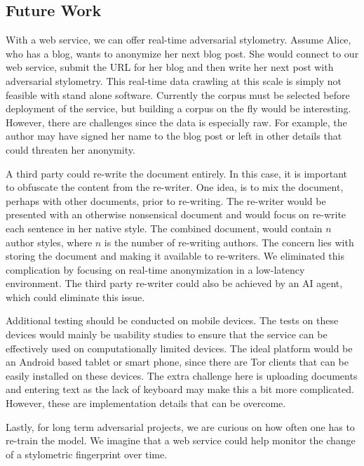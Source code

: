 \documentclass[letterpaper]{article}
\begin{document}
\subsection*{Future Work}

With a web service, we can offer real-time adversarial stylometry.
Assume Alice, who has a blog, wants to anonymize her next blog post.
She would connect to our web service, submit the URL for her blog and
then write her next post with adversarial stylometry.  This real-time
data crawling at this scale is simply not feasible with stand alone
software.  Currently the corpus must be selected before deployment of
the service, but building a corpus on the fly would be interesting.
However, there are challenges since the  data is especially raw.
For example, the author may have signed her name to the blog post or
left in other details that could threaten her anonymity.

A third party could re-write the document entirely.  In this case, it
is important to obfuscate the content from the re-writer.  One idea,
is to mix the document, perhaps with other documents, prior to
re-writing.  The re-writer would be presented with an otherwise
nonsensical document and would focus on re-write each sentence in her
native style.  The combined document, would contain $n$ author styles,
where $n$ is the number of re-writing authors.  The concern lies with
storing the document and making it available to re-writers.  We
eliminated this complication by focusing on real-time anonymization in
a low-latency environment.  The third party re-writer could also be
achieved by an AI agent, which could eliminate this issue.


Additional testing should be conducted on mobile devices.  The tests
on these devices would mainly be usability studies to ensure that the
service can be effectively used on computationally limited devices.
The ideal platform would be an Android based tablet or smart phone,
since there are Tor clients that can be easily installed on these
devices.  The extra challenge here is uploading documents and entering
text as the lack of keyboard may make this a bit more complicated.
However, these are implementation details that can be overcome.

Lastly, for long term adversarial projects, we are curious on how often
one has to re-train the model.  We imagine that a web service could
help monitor the change of a stylometric fingerprint over time.




\end{document}
